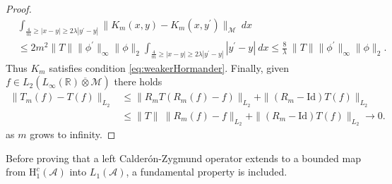 \documentclass[psamsfonts]{amsart}
\newcommand{\Lone}{L_1}
\newcommand{\Linfty}{L_\infty}
\newcommand{\Ltwo}{L_2}
\newcommand{\Honec}{\mathrm{H}_1^c}
\newcommand{\Hardyc}{\Honec(\mathcal{A})}
\newcommand{\id}{\mathrm{Id}}
\newcommand{\Avnat}{\Linfty(\mathbb{R}) \overline{\otimes} \mathcal{M}}
\begin{document}
\begin{proof}
        \begin{align*}
            &\int_{\frac{4}{m} \geq |x-y| \geq 2\lambda |y^\prime -y|} \|K_m(x,y)-K_m(x,y^\prime)\|_{\mathcal{M}} \ dx \\
            &\leq 2 m^2 \|T\| \|\phi^\prime\|_{\infty}\|\phi\|_2 \int_{\frac{4}{m} \geq |x-y| \geq 2\lambda |y^\prime -y|} |y^\prime -y| \ dx \leq \frac{8}{\lambda} \ \|T\| \|\phi^\prime\|_{\infty} \|\phi\|_2.
        \end{align*}
        Thus $K_m$ satisfies condition \eqref{eq:weakerHormander}. Finally, given $f \in \Ltwo(\Avnat)$ there holds
        \begin{align*}
            \|T_m(f) - T(f)\|_{\Ltwo} &\leq \|R_m T (R_m(f) - f)\|_{\Ltwo} + \|(R_m - \id)T(f)\|_{\Ltwo} \\
            &\leq \|T\| \ \|R_m(f) - f\|_{\Ltwo} + \|(R_m - \id)T(f)\|_{\Ltwo} \rightarrow 0.
        \end{align*}
        as $m$ grows to infinity.
  \end{proof}
    
    

    Before proving that a left Calder\'on-Zygmund operator extends to a bounded map from $\Hardyc$ into $\Lone(\mathcal{A})$, a fundamental property is included.
\end{document}
